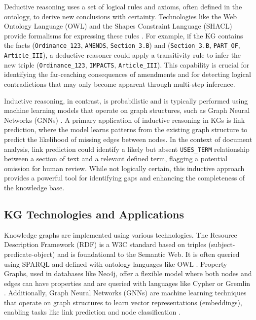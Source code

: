 Deductive reasoning uses a set of logical rules and axioms, often defined in the ontology, to derive new conclusions with certainty. Technologies like the Web Ontology Language (OWL) and the Shapes Constraint Language (SHACL) provide formalisms for expressing these rules \parencite{RefWorks:RefID:110-hitzler2009foundations, RefWorks:RefID:154-knublauch2017shapes}. For example, if the KG contains the facts (\texttt{Ordinance\_123}, \texttt{AMENDS}, \texttt{Section\_3.B}) and (\texttt{Section\_3.B}, \texttt{PART\_OF}, \texttt{Article\_III}), a deductive reasoner could apply a transitivity rule to infer the new triple (\texttt{Ordinance\_123}, \texttt{IMPACTS}, \texttt{Article\_III}). This capability is crucial for identifying the far-reaching consequences of amendments and for detecting logical contradictions that may only become apparent through multi-step inference.

Inductive reasoning, in contrast, is probabilistic and is typically performed using machine learning models that operate on graph structures, such as Graph Neural Networks (GNNs) \parencite{RefWorks:RefID:7-gupta2021graph}. A primary application of inductive reasoning in KGs is link prediction, where the model learns patterns from the existing graph structure to predict the likelihood of missing edges between nodes. In the context of document analysis, link prediction could identify a likely but absent \texttt{USES\_TERM} relationship between a section of text and a relevant defined term, flagging a potential omission for human review. While not logically certain, this inductive approach provides a powerful tool for identifying gaps and enhancing the completeness of the knowledge base.

\subsection{KG Technologies and Applications}
\label{subsec:kg_techandapp}

Knowledge graphs are implemented using various technologies. The Resource Description Framework (RDF) is a W3C standard based on triples (subject-predicate-object) and is foundational to the Semantic Web. It is often queried using SPARQL and defined with ontology languages like OWL \parencite{RefWorks:RefID:109-2025rdf, RefWorks:RefID:111-kumar2013querying, RefWorks:RefID:110-hitzler2009foundations}. Property Graphs, used in databases like Neo4j, offer a flexible model where both nodes and edges can have properties and are queried with languages like Cypher or Gremlin \parencite{RefWorks:RefID:114-fernandes2018graph}. Additionally, Graph Neural Networks (GNNs) are machine learning techniques that operate on graph structures to learn vector representations (embeddings), enabling tasks like link prediction and node classification \parencite{RefWorks:RefID:7-gupta2021graph, RefWorks:RefID:47-scarselli2009graph, RefWorks:RefID:49-wang2024graph}.

